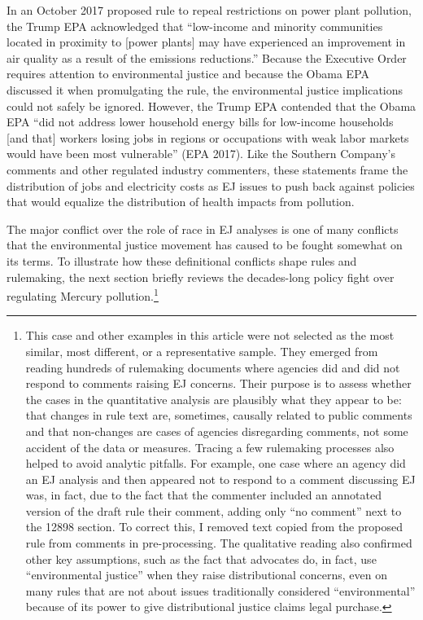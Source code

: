 \documentclass[
      12pt,
        ]{article}
\begin{document}
In an October 2017 proposed rule to repeal
restrictions on power plant pollution, the Trump EPA acknowledged that
``low-income and minority communities located in proximity to {[}power
plants{]} may have experienced an improvement in air quality as a result
of the emissions reductions.'' Because the Executive Order requires
attention to environmental justice and because the Obama EPA discussed
it when promulgating the rule, the environmental justice implications could not safely
be ignored. However, the Trump EPA contended that the Obama EPA ``did not
address lower household energy bills for low-income households {[}and
that{]} workers losing jobs in regions or occupations with weak labor
markets would have been most vulnerable'' (EPA 2017). Like the Southern Company's comments and other regulated industry commenters, these statements frame the distribution of jobs and electricity costs as EJ issues to push back against policies that would equalize the distribution of health impacts from pollution.

The major conflict over the role of race in EJ analyses is one of many conflicts that the environmental justice movement has caused to be fought somewhat on its terms. To illustrate how these definitional conflicts shape rules and rulemaking, the next section briefly reviews the decades-long policy fight over regulating Mercury pollution.\footnote{This case and other examples in this article were not selected as the most similar, most different, or a representative sample. They emerged from reading hundreds of rulemaking documents where agencies did and did not respond to comments raising EJ concerns. Their purpose is to assess whether the cases in the quantitative analysis are plausibly what they appear to be: that changes in rule text are, sometimes, causally related to public comments and that non-changes are cases of agencies disregarding comments, not some accident of the data or measures. Tracing a few rulemaking processes also helped to avoid analytic pitfalls. For example, one case where an agency did an EJ analysis and then appeared not to respond to a comment discussing EJ was, in fact, due to the fact that the commenter included an annotated version of the draft rule their comment, adding only ``no comment'' next to the 12898 section. To correct this, I removed text copied from the proposed rule from comments in pre-processing. The qualitative reading also confirmed other key assumptions, such as the fact that advocates do, in fact, use ``environmental justice'' when they raise distributional concerns, even on many rules that are not about issues traditionally considered ``environmental'' because of its power to give distributional justice claims legal purchase.}
\end{document}
